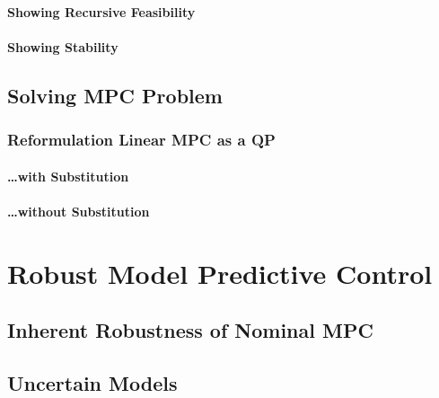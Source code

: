             \subsubsection{Showing Recursive Feasibility} %

            \subsubsection{Showing Stability} %

    \section{Solving MPC Problem} %

        \subsection{Reformulation Linear MPC as a QP} %

            \subsubsection{\dots with Substitution} %

            \subsubsection{\dots without Substitution} %

\chapter{Robust Model Predictive Control} %

    \section{Inherent Robustness of Nominal MPC} %

    \section{Uncertain Models} %

